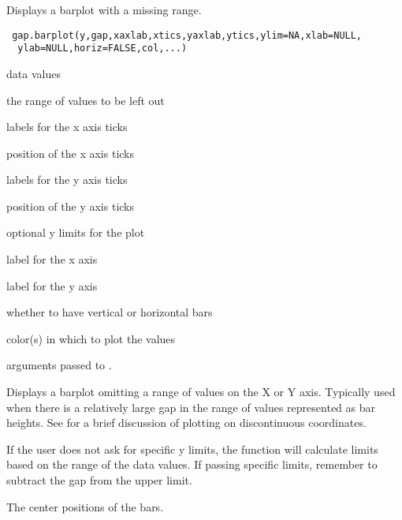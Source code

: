 \begin{Description}\relax
Displays a barplot with a missing range.
\end{Description}
\begin{Usage}
\begin{verbatim}
 gap.barplot(y,gap,xaxlab,xtics,yaxlab,ytics,ylim=NA,xlab=NULL,
  ylab=NULL,horiz=FALSE,col,...)
\end{verbatim}
\end{Usage}
\begin{Arguments}
\begin{ldescription}
\item[\code{y}] data values
\item[\code{gap}] the range of values to be left out
\item[\code{xaxlab}] labels for the x axis ticks
\item[\code{xtics}] position of the x axis ticks
\item[\code{yaxlab}] labels for the y axis ticks
\item[\code{ytics}] position of the y axis ticks
\item[\code{ylim}] optional y limits for the plot
\item[\code{xlab}] label for the x axis
\item[\code{ylab}] label for the y axis
\item[\code{horiz}] whether to have vertical or horizontal bars
\item[\code{col}] color(s) in which to plot the values
\item[\code{...}] arguments passed to .
\end{ldescription}
\end{Arguments}
\begin{Details}\relax
Displays a barplot omitting a range of values on the X or Y axis. Typically 
used when there is a relatively large gap in the range of values 
represented as bar heights. See  for a brief 
discussion of plotting on discontinuous coordinates.

If the user does not ask for specific y limits, the function will calculate
limits based on the range of the data values. If passing specific limits, 
remember to subtract the gap from the upper limit.
\end{Details}
\begin{Value}
The center positions of the bars.
\end{Value}
